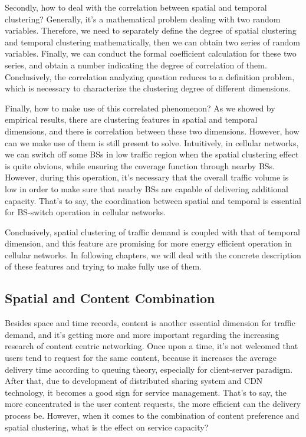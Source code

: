 Secondly, how to deal with the correlation between spatial and temporal clustering? Generally, it's a mathematical problem dealing with two random variables. Therefore, we need to separately define the degree of spatial clustering and temporal clustering mathematically, then we can obtain two series of random variables. Finally, we can conduct the formal coefficient calculation for these two series, and obtain a number indicating the degree of correlation of them. Conclusively, the correlation analyzing question reduces to a definition problem, which is necessary to characterize the clustering degree of different dimensions.

Finally, how to make use of this correlated phenomenon? As we showed by empirical results, there are clustering features in spatial and temporal dimensions, and there is correlation between these two dimensions. However, how can we make use of them is still present to solve. Intuitively, in cellular networks, we can switch off some BSs in low traffic region when the spatial clustering effect is quite obvious, while ensuring the coverage function through nearby BSs. However, during this operation, it's necessary that the overall traffic volume is low in order to make sure that nearby BSs are capable of delivering additional capacity. That's to say, the coordination between spatial and temporal is essential for BS-switch operation in cellular networks.

Conclusively, spatial clustering of traffic demand is coupled with that of temporal dimension, and this feature are promising for more energy efficient operation in cellular networks. In following chapters, we will deal with the concrete description of these features and trying to make fully use of them.
\subsection{Spatial and Content Combination}
Besides space and time records, content is another essential dimension for traffic demand, and it's getting more and more important regarding the increasing research of content centric networking. Once upon a time, it's not welcomed that users tend to request for the same content, because it increases the average delivery time according to queuing theory, especially for client-server paradigm. After that, due to development of distributed sharing system and CDN technology, it becomes a good sign for service management. That's to say, the more concentrated is the user content requests, the more efficient can the delivery process be. However, when it comes to the combination of content preference and spatial clustering, what is the effect on service capacity?

